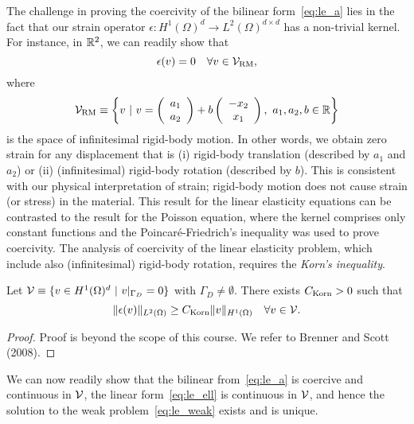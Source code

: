 The challenge in proving the coercivity of the bilinear form~\eqref{eq:le_a} lies in the fact that our strain operator $\epsilon: H^1(\Omega)^d \to L^2(\Omega)^{d \times d}$ has a non-trivial kernel. For instance, in $\RR^2$, we can readily show that
\begin{equation*}
  \epsilon(v) = 0 \quad \forall v \in \calV_{\rm RM},
\end{equation*}
where
\begin{equation*}
  \calV_{\rm RM} \equiv \left\{ v \ | \ v = \bmat{c} a_1 \\ a_2 \emat + b \bmat{c} -x_2 \\ x_1 \emat, \ a_1, a_2, b \in \RR \right\}
\end{equation*}
is  the space of infinitesimal rigid-body motion.  In other words, we obtain zero strain for any displacement that is (i) rigid-body translation (described by $a_1$ and $a_2$) or (ii) (infinitesimal) rigid-body rotation (described by $b$).  This is consistent with our physical interpretation of strain; rigid-body motion does not cause strain (or stress) in the material.  This result for the linear elasticity equations can be contrasted to the result for the Poisson equation, where the kernel comprises only constant functions and the Poincar\'e-Friedrich's inequality was used to prove coercivity. The analysis of coercivity of the linear elasticity problem, which include also (infinitesimal) rigid-body rotation, requires the \emph{Korn's inequality}.
\begin{theorem}
  Let $\calV \equiv \{  v \in  H^1(\Omega)^d \ | \ v|_{\Gamma_D} = 0 \}$ with $\Gamma_D \neq \emptyset$.  There exists $C_{\rm Korn} > 0$ such that
  \begin{equation*}
    \| \epsilon(v) \|_{L^2(\Omega)} \geq C_{\rm Korn} \| v \|_{H^1(\Omega)} \quad \forall v \in \calV.
  \end{equation*}
  \begin{proof}
    Proof is beyond the scope of this course.  We refer to Brenner and Scott (2008).
  \end{proof}
\end{theorem}

We can now readily show that the bilinear from~\eqref{eq:le_a} is coercive and continuous in $\calV$, the linear form~\eqref{eq:le_ell} is continuous in $\calV$, and hence the solution to the weak problem~\eqref{eq:le_weak} exists and is unique.

